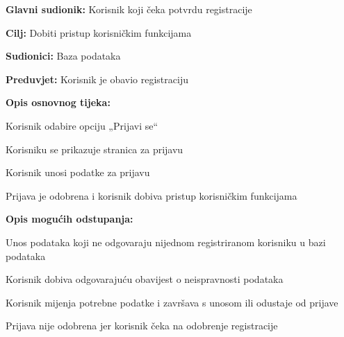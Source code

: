 						\noindent {}
						\begin{packed_item}
							
							\item \textbf{Glavni sudionik: } Korisnik koji čeka potvrdu registracije
							\item  \textbf{Cilj:} Dobiti pristup korisničkim funkcijama
							\item  \textbf{Sudionici:} Baza podataka
							\item  \textbf{Preduvjet:} Korisnik je obavio registraciju
							\item  \textbf{Opis osnovnog tijeka:}
							
							\item[] \begin{packed_enum}
								
								\item Korisnik odabire opciju „Prijavi se“ 
								\item Korisniku se prikazuje stranica za prijavu  
								\item Korisnik unosi podatke za prijavu 
								\item Prijava je odobrena i korisnik dobiva pristup korisničkim funkcijama 
								 
								
							\end{packed_enum}
							
							\item  \textbf{Opis mogućih odstupanja:}
							
							\item[] \begin{packed_item}
								
								\item[3.a] Unos podataka koji ne odgovaraju nijednom registriranom korisniku u bazi podataka  
								\item[] \begin{packed_enum}
									
									\item Korisnik dobiva odgovarajuću obavijest o neispravnosti podataka 
									\item Korisnik mijenja potrebne podatke i završava s unosom ili odustaje od prijave 
									
								\end{packed_enum}
								\item[4.a] Prijava nije odobrena jer korisnik čeka na odobrenje registracije    
								\item[] \begin{packed_enum}
									

\end{packed_enum}
\end{packed_item}
\end{packed_item}
